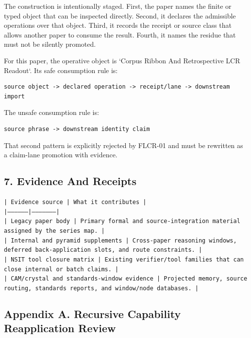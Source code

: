 \documentclass[11pt]{article}
\begin{document}
The construction is intentionally staged. First, the paper names the finite or
typed object that can be inspected directly. Second, it declares the admissible
operations over that object. Third, it records the receipt or source class that
allows another paper to consume the result. Fourth, it names the residue that
must not be silently promoted.

For this paper, the operative object is `Corpus Ribbon And Retrospective LCR Readout`. Its safe consumption
rule is:

\begin{verbatim}
source object -> declared operation -> receipt/lane -> downstream import
\end{verbatim}

The unsafe consumption rule is:

\begin{verbatim}
source phrase -> downstream identity claim
\end{verbatim}

That second pattern is explicitly rejected by FLCR-01 and must be rewritten as
a claim-lane promotion with evidence.

\subsection*{7. Evidence And Receipts}

\noindent\texttt{| Evidence source | What it contributes |}\\
\noindent\texttt{|-----------------|---------------------|}\\
\noindent\texttt{| Legacy paper body | Primary formal and source-integration material assigned by the series map. |}\\
\noindent\texttt{| Internal and pyramid supplements | Cross-paper reasoning windows, deferred back-application slots, and route constraints. |}\\
\noindent\texttt{| NSIT tool closure matrix | Existing verifier/tool families that can close internal or batch claims. |}\\
\noindent\texttt{| CAM/crystal and standards-window evidence | Projected memory, source routing, standards reports, and window/node databases. |}\\

\subsection*{Appendix A. Recursive Capability Reapplication Review}
\end{document}
